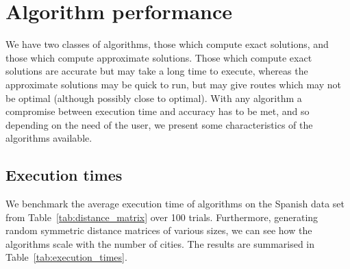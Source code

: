 \section{Algorithm performance}
\label{sec:algorithm_performance}

We have two classes of algorithms, those which compute exact solutions, and those which compute approximate solutions. Those which compute exact solutions are accurate but may take a long time to execute, whereas the approximate solutions may be quick to run, but may give routes which may not be optimal (although possibly close to optimal). With any algorithm a compromise between execution time and accuracy has to be met, and so  depending on the need of the user, we present some characteristics of the algorithms available.

\subsection{Execution times}
\label{subsec:execution_times}

We benchmark the average execution time of algorithms on the Spanish data set from Table~\ref{tab:distance_matrix} over 100 trials. Furthermore, generating random symmetric distance matrices of various sizes, we can see how the algorithms scale with the number of cities. The results are summarised  in Table~\ref{tab:execution_times}.

